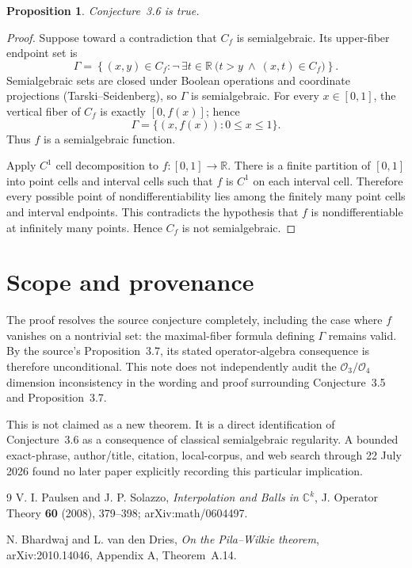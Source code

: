 \documentclass[11pt]{article}
\newtheorem*{proposition}{Proposition}
\begin{document}
\begin{proposition}
Conjecture~3.6 is true.
\end{proposition}

\begin{proof}
Suppose toward a contradiction that $C_f$ is semialgebraic.  Its upper-fiber
endpoint set is
\[
 \Gamma=\left\{(x,y)\in C_f:
 \neg\,\exists t\in\mathbb R\ \bigl(t>y\ \wedge\ (x,t)\in C_f\bigr)
 \right\}.
\]
Semialgebraic sets are closed under Boolean operations and coordinate
projections (Tarski--Seidenberg), so $\Gamma$ is semialgebraic.  For every
$x\in[0,1]$, the vertical fiber of $C_f$ is exactly $[0,f(x)]$; hence
\[
 \Gamma=\{(x,f(x)):0\le x\le1\}.
\]
Thus $f$ is a semialgebraic function.

Apply $C^1$ cell decomposition to $f:[0,1]\to\mathbb R$.  There is a finite
partition of $[0,1]$ into point cells and interval cells such that $f$ is
$C^1$ on each interval cell.  Therefore every possible point of
nondifferentiability lies among the finitely many point cells and interval
endpoints.  This contradicts the hypothesis that $f$ is nondifferentiable at
infinitely many points.  Hence $C_f$ is not semialgebraic.
\end{proof}

\section{Scope and provenance}

The proof resolves the source conjecture completely, including the case where
$f$ vanishes on a nontrivial set: the maximal-fiber formula defining
$\Gamma$ remains valid.  By the source's Proposition~3.7, its stated
operator-algebra consequence is therefore unconditional.  This note does not
independently audit the $\mathcal O_3/\mathcal O_4$ dimension inconsistency in
the wording and proof surrounding Conjecture~3.5 and Proposition~3.7.

This is not claimed as a new theorem.  It is a direct identification of
Conjecture~3.6 as a consequence of classical semialgebraic regularity.  A
bounded exact-phrase, author/title, citation, local-corpus, and web search
through 22 July 2026 found no later paper explicitly recording this
particular implication.

\begin{thebibliography}{9}
V. I. Paulsen and J. P. Solazzo,
\emph{Interpolation and Balls in $\mathbb C^k$},
J. Operator Theory \textbf{60} (2008), 379--398;
arXiv:math/0604497.

N. Bhardwaj and L. van den Dries,
\emph{On the Pila--Wilkie theorem},
arXiv:2010.14046, Appendix A, Theorem~A.14.
\end{thebibliography}
\end{document}

